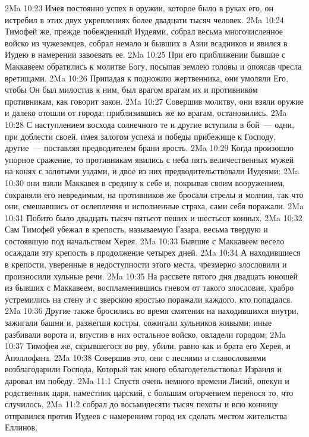 \vs 2Ma 10:23 Имея постоянно успех в оружии, которое было в руках его, он истребил в этих двух укреплениях более двадцати тысяч человек.
\rsbpar\vs 2Ma 10:24 Тимофей же, прежде побежденный Иудеями, собрал весьма многочисленное войско из чужеземцев, собрал немало и бывших в Азии всадников и явился в Иудею в намерении завоевать ее.
\vs 2Ma 10:25 При его приближении бывшие с Маккавеем обратились к молитве Богу, посыпав землею головы и опоясав чресла вретищами.
\vs 2Ma 10:26 Припадая к подножию жертвенника, они умоляли Его, чтобы Он был милостив к ним, был врагом врагам их и противником противникам, как говорит закон.
\vs 2Ma 10:27 Совершив молитву, они взяли оружие и далеко отошли от города; приблизившись же ко врагам, остановились.
\vs 2Ma 10:28 С наступлением восхода солнечного те и другие вступили в бой~--- одни, при доблести своей, имея залогом успеха и победы прибежище к Господу, другие~--- поставляя предводителем брани ярость.
\vs 2Ma 10:29 Когда произошло упорное сражение, то противникам явились с неба пять величественных мужей на конях с золотыми уздами, и двое из них предводительствовали Иудеями:
\vs 2Ma 10:30 они взяли Маккавея в средину к себе и, покрывая своим вооружением, сохраняли его невредимым, на противников же бросали стрелы и молнии, так что они, смешавшись от ослепления и исполненные страха, сами себя поражали.
\vs 2Ma 10:31 Побито было двадцать тысяч пятьсот пеших и шестьсот конных.
\vs 2Ma 10:32 Сам Тимофей убежал в крепость, называемую Газара, весьма твердую и состоявшую под начальством Херея.
\vs 2Ma 10:33 Бывшие с Маккавеем весело осаждали эту крепость в продолжение четырех дней.
\vs 2Ma 10:34 А находившиеся в крепости, уверенные в недоступности этого места, чрезмерно злословили и произносили хульные речи.
\vs 2Ma 10:35 На рассвете пятого дня двадцать юношей из бывших с Маккавеем, воспламенившись гневом от такого злословия, храбро устремились на стену и с зверскою яростью поражали каждого, кто попадался.
\vs 2Ma 10:36 Другие также бросились во время смятения на находившихся внутри, зажигали башни и, разжегши костры, сожигали хульников живыми; иные разбивали ворота и, впустив в них остальное войско, овладели городом;
\vs 2Ma 10:37 Тимофея же, скрывшегося во рву, убили, равно как и брата его Херея, и Аполлофана.
\vs 2Ma 10:38 Совершив это, они с песнями и славословиями возблагодарили Господа, Который так много облагодетельствовал Израиля и даровал им победу.
\vs 2Ma 11:1 Спустя очень немного времени Лисий, опекун и родственник царя, наместник царский, с большим огорчением перенося то, что случилось,
\vs 2Ma 11:2 собрал до восьмидесяти тысяч пехоты и всю конницу  отправился против Иудеев с намерением город их сделать местом жительства Еллинов,
